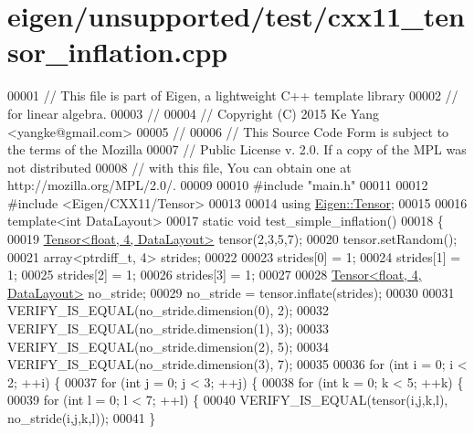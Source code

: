 \hypertarget{eigen_2unsupported_2test_2cxx11__tensor__inflation_8cpp_source}{}\section{eigen/unsupported/test/cxx11\+\_\+tensor\+\_\+inflation.cpp}
\label{eigen_2unsupported_2test_2cxx11__tensor__inflation_8cpp_source}

\begin{DoxyCode}
00001 \textcolor{comment}{// This file is part of Eigen, a lightweight C++ template library}
00002 \textcolor{comment}{// for linear algebra.}
00003 \textcolor{comment}{//}
00004 \textcolor{comment}{// Copyright (C) 2015 Ke Yang <yangke@gmail.com>}
00005 \textcolor{comment}{//}
00006 \textcolor{comment}{// This Source Code Form is subject to the terms of the Mozilla}
00007 \textcolor{comment}{// Public License v. 2.0. If a copy of the MPL was not distributed}
00008 \textcolor{comment}{// with this file, You can obtain one at http://mozilla.org/MPL/2.0/.}
00009 
00010 \textcolor{preprocessor}{#include "main.h"}
00011 
00012 \textcolor{preprocessor}{#include <Eigen/CXX11/Tensor>}
00013 
00014 \textcolor{keyword}{using} \hyperlink{class_eigen_1_1_tensor}{Eigen::Tensor};
00015 
00016 \textcolor{keyword}{template}<\textcolor{keywordtype}{int} DataLayout>
00017 \textcolor{keyword}{static} \textcolor{keywordtype}{void} test\_simple\_inflation()
00018 \{
00019   \hyperlink{class_eigen_1_1_tensor}{Tensor<float, 4, DataLayout>} tensor(2,3,5,7);
00020   tensor.setRandom();
00021   array<ptrdiff\_t, 4> strides;
00022 
00023   strides[0] = 1;
00024   strides[1] = 1;
00025   strides[2] = 1;
00026   strides[3] = 1;
00027 
00028   \hyperlink{class_eigen_1_1_tensor}{Tensor<float, 4, DataLayout>} no\_stride;
00029   no\_stride = tensor.inflate(strides);
00030 
00031   VERIFY\_IS\_EQUAL(no\_stride.dimension(0), 2);
00032   VERIFY\_IS\_EQUAL(no\_stride.dimension(1), 3);
00033   VERIFY\_IS\_EQUAL(no\_stride.dimension(2), 5);
00034   VERIFY\_IS\_EQUAL(no\_stride.dimension(3), 7);
00035 
00036   \textcolor{keywordflow}{for} (\textcolor{keywordtype}{int} i = 0; i < 2; ++i) \{
00037     \textcolor{keywordflow}{for} (\textcolor{keywordtype}{int} j = 0; j < 3; ++j) \{
00038       \textcolor{keywordflow}{for} (\textcolor{keywordtype}{int} k = 0; k < 5; ++k) \{
00039         \textcolor{keywordflow}{for} (\textcolor{keywordtype}{int} l = 0; l < 7; ++l) \{
00040           VERIFY\_IS\_EQUAL(tensor(i,j,k,l), no\_stride(i,j,k,l));
00041         \}

\end{DoxyCode}
